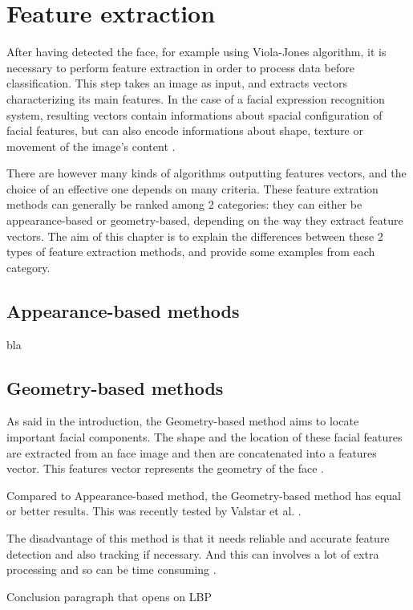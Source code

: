 \chapter{Feature extraction}
\label{chap:extraction}

\noindent After having detected the face, for example using Viola-Jones algorithm, it is necessary to perform feature extraction in order to process data before classification. 
This step takes an image as input, and extracts vectors characterizing its main features. In the case of a facial expression recognition system, resulting vectors contain informations about spacial configuration of facial features, but can also encode informations about shape, texture or movement of the image's content \cite{CHI03}.
\newline

\noindent There are however many kinds of algorithms outputting features vectors, and the choice of an effective one depends on many criteria. These feature extration methods can generally be ranked among 2 categories: they can either be appearance-based or geometry-based, depending on the way they extract feature vectors. The aim of this chapter is to explain the differences between these 2 types of feature extraction methods, and provide some examples from each category.
\newline

\section{Appearance-based methods}

\noindent bla
\newline

\section{Geometry-based methods}

\noindent As said in the introduction, the Geometry-based method aims to locate important facial components. The shape and the location of these facial features are extracted from an face image and then are concatenated into a features vector. This features vector represents the geometry of the face \cite{SHA09}.
\newline

\noindent Compared to Appearance-based method, the Geometry-based method has equal or better results. This was recently tested by Valstar et al. \cite{VAL05} \cite{VAL06}.
\newline

\noindent The disadvantage of this method is that it needs reliable and accurate feature detection and also tracking if necessary. And this can involves a lot of extra processing and so can be time consuming \cite{SHA09}.
\newline

\noindent Conclusion paragraph that opens on LBP

